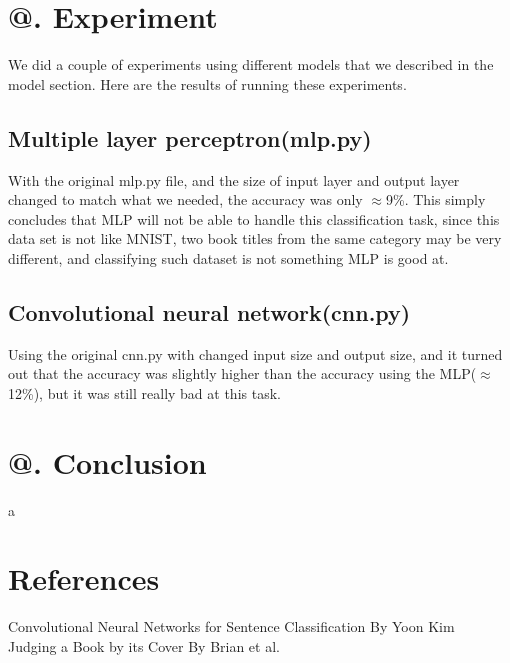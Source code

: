 \documentclass[jou,apacite, 10px]{apa6}
\makeatletter
\newcommand*{\rom}[1]{\expandafter\@slowromancap\romannumeral #1@}
\makeatother
\begin{document}
\section{\rom{6}. Experiment}
We did a couple of experiments using different models that we described in the model section. Here are the results of running these experiments.

\subsection{Multiple layer perceptron(mlp.py)}
With the original mlp.py file, and the size of input layer and output layer  changed to match what we needed, the accuracy was only $\approx$9\%. This simply concludes that MLP will not be able to handle this classification task, since this data set is not like MNIST, two book titles from the same category may be very different, and classifying such dataset is not something MLP is good at.

\subsection {Convolutional neural network(cnn.py)}
Using the original cnn.py with changed input size and output size, and it turned out that the accuracy was slightly higher than the accuracy using the MLP($\approx$12\%), but it was still really bad at this task.


\section{\rom{7}. Conclusion}
a
\section{References}
\noindent Convolutional Neural Networks for Sentence Classification By Yoon Kim\\
Judging a Book by its Cover By Brian et al.
\end{document}
